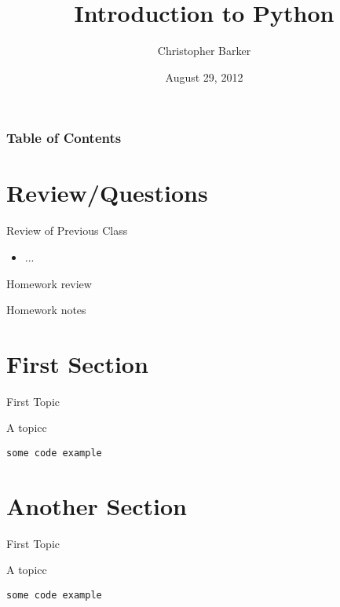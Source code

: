 \documentclass{beamer}
\title[Intro to Python: Week 9]{Introduction  to Python}
\author{Christopher Barker}
\institute{UW Continuing Education / Isilon}
\date{August 29, 2012}
\begin{document}
\begin{frame}
  \titlepage
\end{frame}

\begin{frame}
\frametitle{Table of Contents}
  \tableofcontents
\end{frame}


\section{Review/Questions}

\begin{frame}{Review of Previous Class}

\begin{itemize}
  \item ...
\end{itemize}

\end{frame}


\begin{frame}{Homework review}

  {\Large Homework notes }

\end{frame}

\section{First Section}

\begin{frame}[fragile]{First Topic}

 {\Large A topicc}

\begin{verbatim}
some code example
\end{verbatim}

\end{frame} 

\section{Another Section}

\begin{frame}[fragile]{First Topic}

 {\Large A topicc}

\begin{verbatim}
some code example
\end{verbatim}

\end{frame} 
\end{document}
